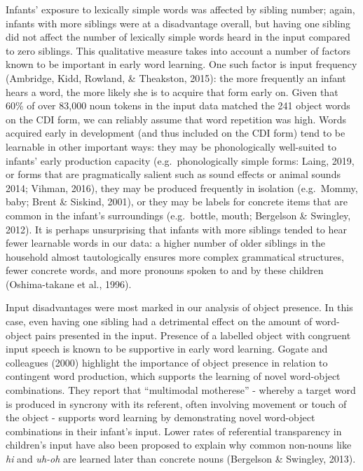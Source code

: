 \documentclass[man,floatsintext]{apa6}
\begin{document}
Infants' exposure to lexically simple words was affected by sibling number; again, infants with more siblings were at a disadvantage overall, but having one sibling did not affect the number of lexically simple words heard in the input compared to zero siblings. This qualitative measure takes into account a number of factors known to be important in early word learning. One such factor is input frequency (Ambridge, Kidd, Rowland, \& Theakston, 2015): the more frequently an infant hears a word, the more likely she is to acquire that form early on. Given that 60\% of over 83,000 noun tokens in the input data matched the 241 object words on the CDI form, we can reliably assume that word repetition was high. Words acquired early in development (and thus included on the CDI form) tend to be learnable in other important ways: they may be phonologically well-suited to infants' early production capacity (e.g.~phonologically simple forms: Laing, 2019, or forms that are pragmatically salient such as sound effects or animal sounds 2014; Vihman, 2016), they may be produced frequently in isolation (e.g.~Mommy, baby; Brent \& Siskind, 2001), or they may be labels for concrete items that are common in the infant's surroundings (e.g.~bottle, mouth; Bergelson \& Swingley, 2012). It is perhaps unsurprising that infants with more siblings tended to hear fewer learnable words in our data: a higher number of older siblings in the household almost tautologically ensures more complex grammatical structures, fewer concrete words, and more pronouns spoken to and by these children (Oshima-takane et al., 1996).

Input disadvantages were most marked in our analysis of object presence. In this case, even having one sibling had a detrimental effect on the amount of word-object pairs presented in the input. Presence of a labelled object with congruent input speech is known to be supportive in early word learning. Gogate and colleagues (2000) highlight the importance of object presence in relation to contingent word production, which supports the learning of novel word-object combinations. They report that \enquote{multimodal motherese} - whereby a target word is produced in syncrony with its referent, often involving movement or touch of the object - supports word learning by demonstrating novel word-object combinations in their infant's input. Lower rates of referential transparency in children's input have also been proposed to explain why common non-nouns like \emph{hi} and \emph{uh-oh} are learned later than concrete nouns (Bergelson \& Swingley, 2013).
\end{document}
